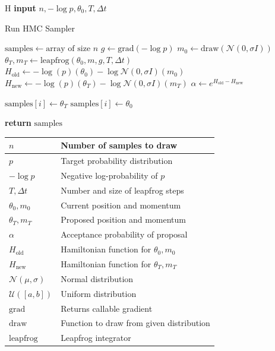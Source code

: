 \documentclass[conference]{IEEEtran}
\begin{document}
\begin{algorithm}{H}
\textbf{input} $n, -\log p, \theta_0, T, \Delta t$
\caption{Run HMC Sampler}
\begin{algorithmic}[H]
\State $\text{samples} \gets \text{array of size } n$
\State $g \gets \text{grad}(-\log p)$
    \State $m_0 \gets \text{draw}(\mathcal{N}(0, \sigma I))$
    \State $\theta_T, m_T \gets \text{leapfrog}(\theta_0, m, g, T, \Delta t)$
    \State $H_\text{old} \gets -\log(p)(\theta_0) - \log \mathcal{N}(0, \sigma I)(m_0)$
    \State $H_\text{new} \gets -\log(p)(\theta_T) - \log \mathcal{N}(0, \sigma I)(m_T)$
    \State $\alpha \gets e^{H_\text{old} - H_\text{new}}$
    
        \State $\text{samples}[i] \gets \theta_T$
    \Else
        \State $\text{samples}[i] \gets \theta_0$
    \EndIf
\EndFor
\end{algorithmic}
\textbf{return} $\text{samples}$
\end{algorithm}

\begin{tabular}{| m{1.5cm} | m{6cm} |}
    \hline
    $n$ & Number of samples to draw\\
    \hline
    $p$ & Target probability distribution\\
    \hline
    $-\log p$ & Negative log-probability of $p$\\
    \hline
    $T, \Delta t$ & Number and size of leapfrog steps\\
    \hline
    $\theta_0, m_0$ & Current position and momentum\\
    \hline
    $\theta_T, m_T$ & Proposed position and momentum\\
    \hline
    $\alpha$ & Acceptance probability of proposal\\
    \hline
    $H_\text{old}$ & Hamiltonian function for $\theta_0, m_0$\\
    \hline
    $H_\text{new}$ & Hamiltonian function for $\theta_T, m_T$\\
    \hline
    $\mathcal{N}(\mu, \sigma)$ & Normal distribution\\
    \hline
    $\mathcal{U}([a, b])$ & Uniform distribution\\
    \hline
    $\text{grad}$ & Returns callable gradient\\
    \hline
    $\text{draw}$ & Function to draw from given distribution\\
    \hline
    $\text{leapfrog}$ & Leapfrog integrator\\
    \hline
\end{tabular}\\~\\
\end{document}
